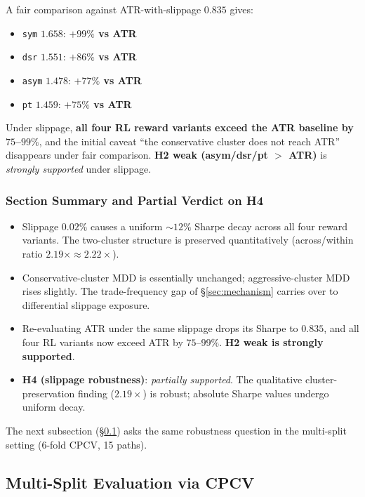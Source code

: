\documentclass[11pt, a4paper]{article}
\begin{document}
A fair comparison against ATR-with-slippage $0.835$ gives:
\begin{itemize}[leftmargin=*]
\item \texttt{sym} $1.658$: \textbf{$+99\%$ vs ATR}
\item \texttt{dsr} $1.551$: \textbf{$+86\%$ vs ATR}
\item \texttt{asym} $1.478$: \textbf{$+77\%$ vs ATR}
\item \texttt{pt} $1.459$: \textbf{$+75\%$ vs ATR}
\end{itemize}
Under slippage, \textbf{all four RL reward variants exceed the ATR baseline
by $75$--$99\%$}, and the initial caveat ``the conservative cluster does not
reach ATR'' disappears under fair comparison. \textbf{H2 weak (asym/dsr/pt
$>$ ATR)} is \emph{strongly supported} under slippage.

\subsubsection{Section Summary and Partial Verdict on H4}
\label{sec:slippage_conclusion}

\begin{itemize}[leftmargin=*]
\item Slippage $0.02\%$ causes a uniform $\sim 12\%$ Sharpe decay across all
four reward variants. The two-cluster structure is preserved
quantitatively (across/within ratio $2.19\times \approx 2.22\times$).
\item Conservative-cluster MDD is essentially unchanged; aggressive-cluster
MDD rises slightly. The trade-frequency gap of \S\ref{sec:mechanism} carries
over to differential slippage exposure.
\item Re-evaluating ATR under the same slippage drops its Sharpe to $0.835$,
and all four RL variants now exceed ATR by $75$--$99\%$. \textbf{H2 weak is
strongly supported}.
\item \textbf{H4 (slippage robustness)}: \emph{partially supported}. The
qualitative cluster-preservation finding ($2.19\times$) is robust; absolute
Sharpe values undergo uniform decay.
\end{itemize}

The next subsection (\S\ref{sec:cpcv}) asks the same robustness question in
the multi-split setting (6-fold CPCV, 15 paths).

\subsection{Multi-Split Evaluation via CPCV}
\label{sec:cpcv}
\end{document}
